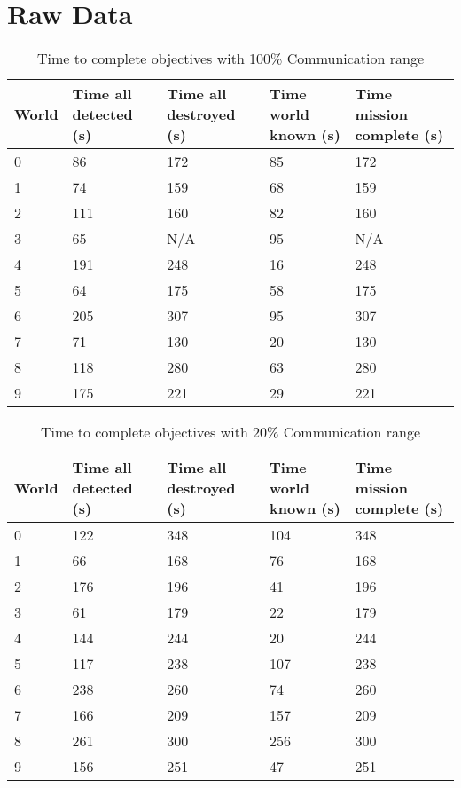 \chapter{Raw Data}
\label{sec:raw_data}
\begin{table}[H]
	\caption{Time to complete objectives with 100\% Communication range}
	\centering
	\label{tab:comm100}
	
	\begin{tabular}{|p{1cm}|p{1.5cm}|p{1.75cm}|p{1.5cm}|p{1.5cm}|}
		\hline
		World & Time all detected (s) & Time all destroyed (s) & Time world known (s) & Time mission complete (s) \\
		\hline
		0&	 86 & 172 & 85 & 172 \\ \hline
		1&	 74 & 159 & 68 & 159 \\ \hline
		2&	111 & 160 & 82 & 160 \\ \hline
		3&	 65 & N/A & 95 & N/A \\ \hline
		4&	191 & 248 & 16 & 248 \\ \hline
		5&	 64 & 175 & 58 & 175 \\ \hline
		6&	205 & 307 & 95 & 307 \\ \hline
		7&	 71 & 130 & 20 & 130 \\ \hline
		8&	118 & 280 & 63 & 280 \\ \hline
		9&	175 & 221 & 29 & 221 \\ \hline
	\end{tabular}
\end{table}



\begin{table}[H]
	\caption{Time to complete objectives with 20\% Communication range}
	\centering
	\label{tab:comm20}
	
	\begin{tabular}{|p{1cm}|p{1.5cm}|p{1.75cm}|p{1.5cm}|p{1.5cm}|}
		\hline
		World & Time all detected (s) & Time all destroyed (s) & Time world known (s) & Time mission complete (s) \\
		\hline
		0&122&348&104&348 \\ \hline
		1&66&168&76&168 \\ \hline
		2&176&196&41&196 \\ \hline
		3&61&179&22&179 \\ \hline
		4&144&244&20&244 \\ \hline
		5&117&238&107&238 \\ \hline
		6&238&260&74&260 \\ \hline
		7&166&209&157&209 \\ \hline
		8&261&300&256&300 \\ \hline
		9&156&251&47&251 \\ \hline
	\end{tabular}
\end{table}

